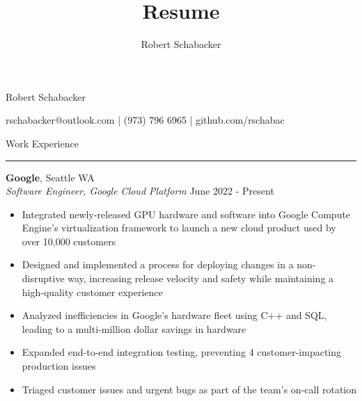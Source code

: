 \documentclass{article}
\title{Resume}
\author{Robert Schabacker}
\newcommand \spacingBetweenHeadings {0.3em}
\newcommand \spacingAfterHeadings {0.5em}
\begin{document}
\begin{center}
{\huge Robert Schabacker\par}
\vspace{0.3em}
{\Large rschabacker@outlook.com  |  (973) 796 6965  |  github.com/rschabac\par}
\end{center}
\vspace{-1.3em}
\vspace{\spacingBetweenHeadings}


\noindent
\huge Work Experience\par
\vspace{0.1em}
\hrule
\Large
\vspace{\spacingAfterHeadings}

\noindent
\textbf{Google}, Seattle WA\\
\textit{Software Engineer, Google Cloud Platform}
\hfill
June 2022 - Present\\
\vspace{-1em}
\begin{itemize}
\item Integrated newly-released GPU hardware and software into Google Compute Engine's virtualization framework to launch a new cloud product used by over 10,000 customers
\item Designed and implemented a process for deploying changes in a non-disruptive way, increasing release velocity and safety while maintaining a high-quality customer experience
\item Analyzed inefficiencies in Google's hardware fleet using C++ and SQL, leading to a multi-million dollar savings in hardware
\item Expanded end-to-end integration testing, preventing 4 customer-impacting production issues
\item Triaged customer issues and urgent bugs as part of the team's on-call rotation
\end{itemize}
\end{document}
